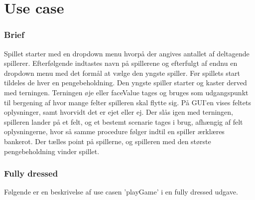 \pagebreak

\section{Use case}
\subsubsection{Brief}
Spillet starter med en dropdown menu hvorpå der angives antallet af deltagende spillerer.
Efterfølgende indtastes navn på spillerene og efterfulgt af endnu en dropdown menu med det formål at vælge den yngste spiller.
Før spillets start tildeles de hver en pengebeholdning.
Den yngste spiller starter og kaster derved med terningen.
Terningen øje eller faceValue tages og bruges som udgangspunkt til bergening af hvor mange felter spilleren skal flytte sig.
På GUI'en vises feltets oplysninger, samt hvorvidt det er ejet eller ej.
Der slås igen med terningen, spilleren lander på et felt, og et bestemt scenarie tages i brug, afhængig af felt oplysningerne, hvor så samme procedure følger indtil en spiller ærklæres bankerot.
Der tælles point på spillerne, og spilleren med den største pengebeholdning vinder spillet.\\

\subsubsection{Fully dressed}
Følgende er en beskrivelse af use casen 'playGame' i en fully dressed udgave.

